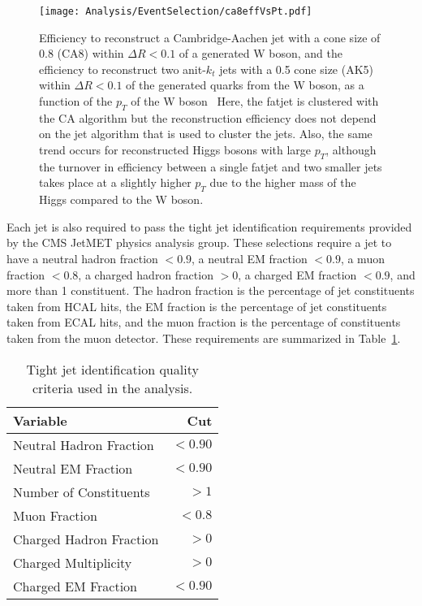 \begin{figure}[h!]
\begin{center}
\texttt{[image: Analysis/EventSelection/ca8effVsPt.pdf]}
\end{center}
\caption{Efficiency to reconstruct a Cambridge-Aachen jet with a cone size of 0.8 (CA8) within $\Delta R < 0.1$ of a generated W boson, and the efficiency to reconstruct two anit-$k_t$ jets with a 0.5 cone size (AK5) within $\Delta R < 0.1$ of the generated quarks from the W boson, as a function of the $p_{T}$ of the W boson~\cite{BoostedWid} Here, the fatjet is clustered with the CA algorithm but the reconstruction efficiency does not depend on the jet algorithm that is used to cluster the jets. Also, the same trend occurs for reconstructed Higgs bosons with large $p_{T}$, although the turnover in efficiency between a single fatjet and two smaller jets takes place at a slightly higher $p_{T}$ due to the higher mass of the Higgs compared to the W boson.}
\label{fig:BoostedRecoEff}
\end{figure}

Each jet is also required to pass the tight jet identification requirements provided by the CMS JetMET physics analysis group. These selections require a jet to have a neutral hadron fraction $< 0.9$, a neutral EM fraction $< 0.9$, a muon fraction $< 0.8$, a charged hadron fraction $> 0$, a charged EM fraction $< 0.9$, and more than 1 constituent. The hadron fraction is the percentage of jet constituents taken from HCAL hits, the EM fraction is the percentage of jet constituents taken from ECAL hits, and the muon fraction is the percentage of constituents taken from the muon detector. These requirements are summarized in Table~\ref{tab:tightjetid}.

\begin{table}[h!]
  \begin{center}
    \begin{tabular}{l r}
    \hline
    \hline
    Variable &  Cut \\
    \hline
    Neutral Hadron Fraction & $<0.90$  \\
    Neutral EM Fraction     & $<0.90$  \\
    Number of Constituents  & $>1$     \\
    Muon Fraction           & $<0.8$   \\
    Charged Hadron Fraction & $>0$     \\
    Charged Multiplicity    & $>0$     \\
    Charged EM Fraction     & $< 0.90$ \\
    \hline
    \hline
    \end{tabular}
   \caption{Tight jet identification quality criteria used in the analysis.\label{tab:tightjetid}}
  \end{center}
\end{table}


